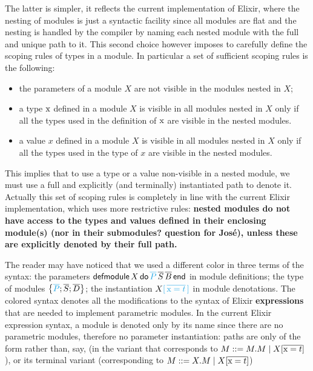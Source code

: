 \documentclass[a4paper,10pt]{article}
\begin{document}
 The latter is simpler, it reflects the current implementation of Elixir, where the nesting of modules is just a syntactic facility since all modules are flat and the nesting is handled by the compiler by naming each nested module with the full and unique path to it.  This second choice however imposes to carefully define the scoping rules of types in a module. In particular a set of sufficient scoping rules is the following:
 \begin{itemize}  
  \item the parameters of a module $X$ are not visible in the modules nested in $X$;
  \item a type $\text{\rm x}$ defined in a module $X$ is visible in all modules nested in $X$ only if all the types used in the definition of $\text{\rm x}$ are visible in the nested modules.
  \item a value $x$ defined in a module $X$ is visible in all modules nested in $X$ only if all the types used in the type of $x$ are visible in the nested modules.
 \end{itemize}
 This implies that to use a type or a value non-visible in a nested module, we must use a full and explicitly (and terminally) instantiated path to denote it.
 Actually this set of scoping rules is completely in line with the current Elixir implementation, which uses more restrictive rules:  \textbf{nested modules do not have access to the types and values defined in their enclosing module(s) (nor in their submodules? question for José), unless these are explicitly denoted by their full path.}

The reader may have noticed that we used a different color in three terms of the syntax: the parameters $\kwdefm X \kwdo \textcolor{Cerulean}{\overline{P}}\, \overline{S}\, \overline{B} \kwend$ in module definitions; the type of modules $\left\{\textcolor{Cerulean}{\overline{P}};\overline{S};\overline{D}\right\}$; the instantiation $X\textcolor{Cerulean}{[\,\overline{\tx=t}\,]}$ in module denotations. The colored syntax denotes all the modifications to the syntax of Elixir \textbf{expressions} that are needed to implement parametric modules. In the current  Elixir expression syntax, a module is denoted only by its name since there are no parametric modules, therefore no parameter instantiation: paths are only of the form  rather than, say,  (in the variant that corresponds to $M::= M.M \mid X[\overline{\text{\rm x}=t}]$), or its terminal variant  (corresponding to $M::= X.M\mid X[\overline{\text{\rm x}=t}]$)
\end{document}
